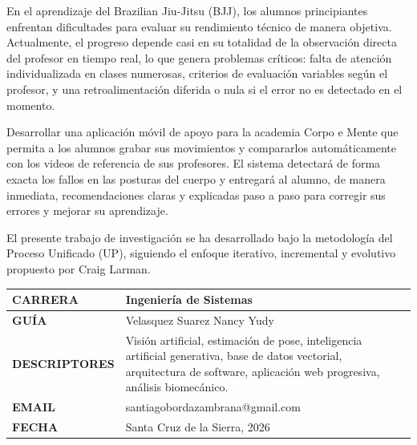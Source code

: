 \documentclass[12pt,letterpaper]{article}
\begin{document}
\vspace{0.8cm}

\vspace{0.3cm}
\noindent En el aprendizaje del Brazilian Jiu-Jitsu (BJJ), los alumnos principiantes enfrentan dificultades para evaluar su rendimiento técnico de manera objetiva. Actualmente, el progreso depende casi en su totalidad de la observación directa del profesor en tiempo real, lo que genera problemas críticos: falta de atención individualizada en clases numerosas, criterios de evaluación variables según el profesor, y una retroalimentación diferida o nula si el error no es detectado en el momento.

\vspace{0.6cm}

\vspace{0.3cm}
\noindent Desarrollar una aplicación móvil de apoyo para la academia Corpo e Mente que permita a los alumnos grabar sus movimientos y compararlos automáticamente con los videos de referencia de sus profesores. El sistema detectará de forma exacta los fallos en las posturas del cuerpo y entregará al alumno, de manera inmediata, recomendaciones claras y explicadas paso a paso para corregir sus errores y mejorar su aprendizaje.

\vspace{0.6cm}

\vspace{0.3cm}
\noindent El presente trabajo de investigación se ha desarrollado bajo la metodología del Proceso Unificado (UP), siguiendo el enfoque iterativo, incremental y evolutivo propuesto por Craig Larman.

\vspace{0.8cm}

\noindent
\begin{tabularx}{\textwidth}{|>{\bfseries}l|X|}
    \hline
    CARRERA & Ingeniería de Sistemas \\ \hline
    GUÍA & Velasquez Suarez Nancy Yudy \\ \hline
    DESCRIPTORES & Visión artificial, estimación de pose, inteligencia artificial generativa, base de datos vectorial, arquitectura de software, aplicación web progresiva, análisis biomecánico. \\ \hline
    EMAIL & santiagobordazambrana@gmail.com \\ \hline
    FECHA & Santa Cruz de la Sierra, 2026 \\ \hline
\end{tabularx}
\end{document}
